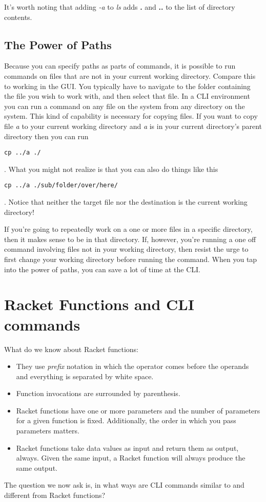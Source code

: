 \documentclass[]{tufte-handout}
\begin{document}
It's worth noting that adding \textit{-a} to \textit{ls} adds \textbf{.} and \textbf{..} to the list of directory contents.

\subsection{The Power of Paths}

Because you can specify paths as parts of commands, it is possible to run commands on files that are not in your current working directory.  Compare this to working in the GUI. You typically have to navigate to the folder containing the file you wish to work with, and then select that file. In a CLI environment you can run a command on any file on the system from any directory on the system.  This kind of capability is necessary for copying files.  If you want to copy file \textit{a} to your current working directory and \textit{a} is in your current directory's parent directory then you can run \begin{verbatim}cp ../a ./\end{verbatim}.  What you might not realize is that you can also do things like this \begin{verbatim}cp ../a ./sub/folder/over/here/ \end{verbatim}.  Notice that neither the target file nor the destination is the current working directory!  

If you're going to repeatedly work on a one or more files in a specific directory, then it makes sense to be in that directory.  If, however, you're running a one off command involving files not in your working directory, then resist the urge to first change your working directory before running the command.  When you tap into the power of paths, you can save a lot of time at the CLI.  
 
\section{Racket Functions and CLI commands}

What do we know about Racket functions:
\begin{itemize}
\item They use \textit{prefix} notation in which the operator comes before the operands and everything is separated by white space.
\item Function invocations are surrounded by parenthesis. 
\item Racket functions have one or more parameters and the number of parameters for a given function is fixed.  Additionally, the order in which you pass parameters matters. 
\item Racket functions take data values as input and return them as output, always. Given the same input, a Racket function will always produce the same output.
\end{itemize}
The question we now ask is, in what ways are CLI commands similar to and different from Racket functions?
\end{document}

